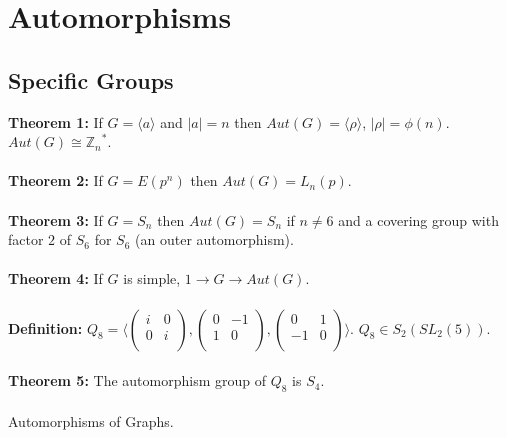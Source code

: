\chapter{Automorphisms}
\section {Specific Groups}
{\bf Theorem 1:}
If $G= \langle a \rangle $ and $|a|=n$ then $Aut(G)= \langle \rho \rangle $, $|\rho|= \phi(n)$.
$Aut(G) \cong {{\mathbb Z}_n}^*$.
\\
\\
{\bf Theorem 2:}
If $G= E(p^n)$ then $Aut(G)= L_n(p)$.
\\
\\
{\bf Theorem 3:}
If $G= S_n$ then $Aut(G)= S_n$ if $n \ne 6$ and a covering group with factor $2$ of $S_6$ for
$S_6$ (an outer automorphism).
\\
\\
{\bf Theorem 4:}
If $G$ is simple, $1 \rightarrow G \rightarrow Aut(G)$.
\\
\\
{\bf Definition:} $Q_8 = 
\langle 
\left(\begin{array} {cc}
i & 0\\
0 & i\\
\end{array}\right),
\left(\begin{array} {cc}
0 & -1\\
1 & 0\\
\end{array}\right),
\left(\begin{array} {cc}
0 & 1\\
-1 & 0\\
\end{array}\right)
\rangle$. $Q_8 \in S_2(SL_2(5))$.
\\
\\
{\bf Theorem 5:}  The automorphism group of $Q_8$ is $S_4$.
\\
\\
Automorphisms of Graphs.

